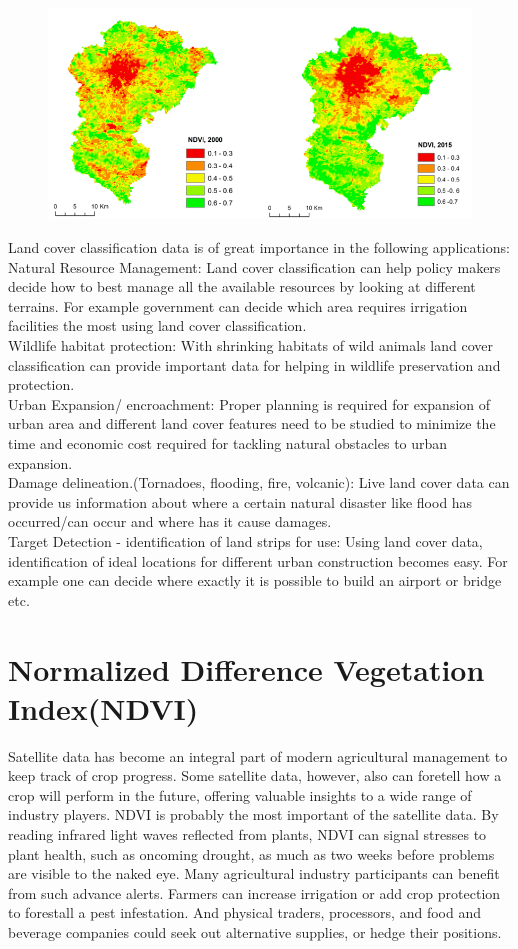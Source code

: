 \documentclass[12pt, a4paper]{report}
\begin{document}
\begin{figure}[h]
\centering
\includegraphics[width=\textwidth]{landcover.png}
\end{figure}
Land cover classification data is of great importance in the following applications:\\
Natural Resource Management: Land cover classification can help policy makers decide how to best manage all the available resources by looking at different terrains. For example government can decide which area requires irrigation facilities the most using land cover classification.  \\
Wildlife habitat protection: With shrinking habitats of wild animals land cover classification can provide important data for helping in wildlife preservation and protection.\\
 Urban Expansion/ encroachment: Proper planning is required for expansion of urban area and different land cover features need to be studied to minimize the time and economic cost required for tackling natural obstacles to urban expansion.\\
 Damage delineation.(Tornadoes, flooding, fire, volcanic): Live land cover data can provide us information about where a certain natural disaster like flood has occurred/can occur and where has it cause damages.\\
 Target Detection - identification of land strips for use: Using land cover data, identification of ideal locations for different urban construction becomes easy. For example one can decide where exactly it is possible to build an airport or bridge etc.\\


\section{Normalized Difference Vegetation Index(NDVI)}
Satellite data has become an integral part of modern agricultural management to keep track of crop progress. Some satellite data, however, also can foretell how a crop will perform in the future, offering valuable insights to a wide range of industry players.
NDVI is probably the most important of the satellite data. By reading infrared light waves reflected from plants, NDVI can signal stresses to plant health, such as oncoming drought, as much as two weeks before problems are visible to the naked eye. Many agricultural industry participants can benefit from such advance alerts. Farmers can increase irrigation or add crop protection to forestall a pest infestation. And physical traders, processors, and food and beverage companies could seek out alternative supplies, or hedge their positions.\cite{ndvione}
\end{document}
